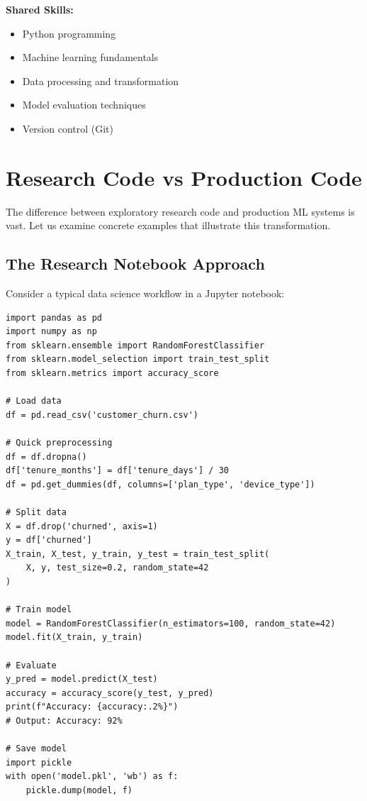 \textbf{Shared Skills:}
\begin{itemize}
    \item Python programming
    \item Machine learning fundamentals
    \item Data processing and transformation
    \item Model evaluation techniques
    \item Version control (Git)
\end{itemize}

\section{Research Code vs Production Code}

The difference between exploratory research code and production ML systems is vast. Let us examine concrete examples that illustrate this transformation.

\subsection{The Research Notebook Approach}

Consider a typical data science workflow in a Jupyter notebook:

\begin{lstlisting}[style=python, caption=Typical Data Science Notebook Code]
import pandas as pd
import numpy as np
from sklearn.ensemble import RandomForestClassifier
from sklearn.model_selection import train_test_split
from sklearn.metrics import accuracy_score

# Load data
df = pd.read_csv('customer_churn.csv')

# Quick preprocessing
df = df.dropna()
df['tenure_months'] = df['tenure_days'] / 30
df = pd.get_dummies(df, columns=['plan_type', 'device_type'])

# Split data
X = df.drop('churned', axis=1)
y = df['churned']
X_train, X_test, y_train, y_test = train_test_split(
    X, y, test_size=0.2, random_state=42
)

# Train model
model = RandomForestClassifier(n_estimators=100, random_state=42)
model.fit(X_train, y_train)

# Evaluate
y_pred = model.predict(X_test)
accuracy = accuracy_score(y_test, y_pred)
print(f"Accuracy: {accuracy:.2%}")
# Output: Accuracy: 92%

# Save model
import pickle
with open('model.pkl', 'wb') as f:
    pickle.dump(model, f)
\end{lstlisting}

